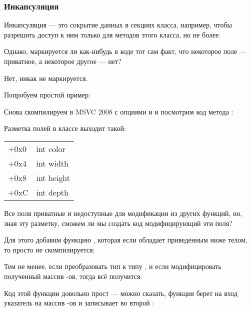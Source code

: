 \subsubsection{Инкапсуляция}

Инкапсуляция --- это сокрытие данных в  секциях класса, например, чтобы разрешить доступ к ним только 
для методов этого класса, но не более.

Однако, маркируется ли как-нибудь в коде тот сам факт, что некоторое поле --- приватное, 
а некоторое другое --- нет?

Нет, никак не маркируется.

Попробуем простой пример:



Снова скомпилируем в MSVC 2008 с опциями \Ox и \Obzero и посмотрим код метода :



Разметка полей в классе выходит такой:

\begin{center}
\begin{tabular}{ | l | l | }
\hline
  \tableheader{} \\
\hline
  +0x0 & int color \\
\hline
  +0x4 & int width \\
\hline
  +0x8 & int height \\
\hline
  +0xC & int depth \\
\hline
\end{tabular}
\end{center}

Все поля приватные и недоступные для модификации из других функций, но, зная эту разметку, 
сможем ли мы создать код модифицирующий эти поля? 

Для этого добавим функцию , которая если обладает 
приведенным ниже телом, то просто не скомпилируется:



Тем не менее, если преобразовать тип  к типу , 
и если модифицировать полученный массив \Tint{}-ов, тогда всё получится.



Код этой функции довольно прост --- можно сказать, функция берет на вход указатель на массив \Tint{}-ов и 
записывает  во второй \Tint{}:

